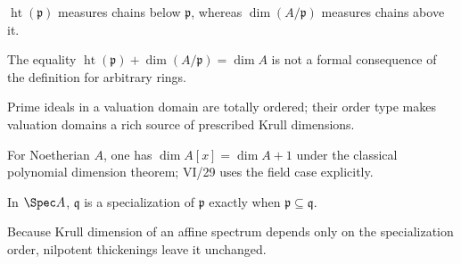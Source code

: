 \begin{example}\label{advex:vi29-09}
$\operatorname{ht}(\mathfrak p)$ measures chains below $\mathfrak p$, whereas $\dim(A/\mathfrak p)$ measures chains above it.
\end{example}

\begin{example}\label{advex:vi29-10}
The equality $\operatorname{ht}(\mathfrak p)+\dim(A/\mathfrak p)=\dim A$ is not a formal consequence of the definition for arbitrary rings.
\end{example}

\begin{example}\label{advex:vi29-11}
Prime ideals in a valuation domain are totally ordered; their order type makes valuation domains a rich source of prescribed Krull dimensions.
\end{example}

\begin{example}\label{advex:vi29-12}
For Noetherian $A$, one has $\dim A[x]=\dim A+1$ under the classical polynomial dimension theorem; VI/29 uses the field case explicitly.
\end{example}

\begin{example}\label{advex:vi29-13}
In $\Spec A$, $\mathfrak q$ is a specialization of $\mathfrak p$ exactly when $\mathfrak p\subseteq\mathfrak q$.
\end{example}

\begin{example}\label{advex:vi29-14}
Because Krull dimension of an affine spectrum depends only on the specialization order, nilpotent thickenings leave it unchanged.
\end{example}
